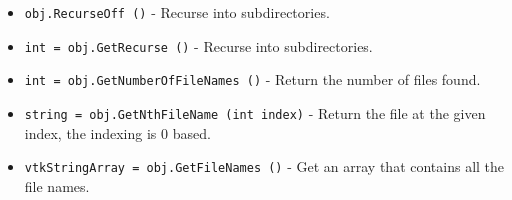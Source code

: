 \begin{itemize}
\item  \verb|obj.RecurseOff ()| -  Recurse into subdirectories.

\item  \verb|int = obj.GetRecurse ()| -  Recurse into subdirectories.

\item  \verb|int = obj.GetNumberOfFileNames ()| -  Return the number of files found.

\item  \verb|string = obj.GetNthFileName (int index)| -  Return the file at the given index, the indexing is 0 based.

\item  \verb|vtkStringArray = obj.GetFileNames ()| -  Get an array that contains all the file names.

\end{itemize}
